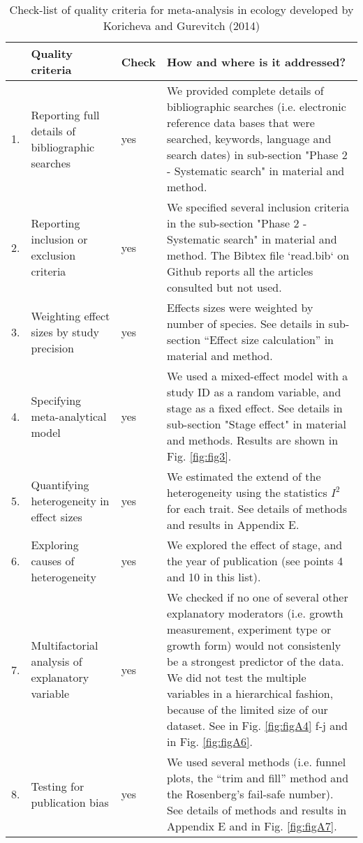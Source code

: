 \documentclass[a4paper,11pt]{article}
\begin{document}
\clearpage
\begin{table}[h!]
\centering
\caption{Check-list of quality criteria for meta-analysis in ecology developed by Koricheva and Gurevitch (2014) }
{\footnotesize
\vspace{0.5cm}
\begin{tabular}{p{0.2cm}p{4cm}p{0.8cm}p{7cm}}
  \hline
  & Quality criteria & Check & How and where is it addressed? \\
  \hline
  1.& Reporting full details of bibliographic searches & yes	& We provided complete details of bibliographic searches (i.e. electronic reference data bases that were searched, keywords, language and search dates) in sub-section "Phase 2 - Systematic search" in material and method.\\
  2.& Reporting inclusion or exclusion criteria & yes & We specified several inclusion criteria in the sub-section "Phase 2 - Systematic search" in material and method. The Bibtex file `read.bib` on Github reports all the articles consulted but not used.\\
  3.& Weighting effect sizes by study precision & yes & Effects sizes were weighted by number of species. See	 details in sub-section ``Effect size calculation'' in material and method.\\
 4.& Specifying meta-analytical model &	yes	& We used a mixed-effect model with a study ID as a random variable, and stage as a fixed effect. See details in sub-section "Stage effect" in material and methods. Results are shown in Fig. \ref{fig:fig3}.\\
 5.& Quantifying heterogeneity in effect sizes &	yes &	We estimated the extend of the heterogeneity using the statistics $I^{2}$ for each trait. See details of methods and results in Appendix E.\\
 6.& Exploring causes of heterogeneity & yes &	We explored the effect of stage, and the year of publication (see points 4 and 10 in this list). \\
 7.& Multifactorial analysis of explanatory variable	& yes & We checked if no one of several other explanatory moderators (i.e. growth measurement, experiment type or growth form) would not consistenly be a strongest predictor of the data. We did not test the multiple variables in a hierarchical fashion, because of the limited size of our dataset. See in Fig. \ref{fig:figA4} f-j and in Fig. \ref{fig:figA6}.\\
  8.& Testing for publication bias &	yes	& We used several methods (i.e. funnel plots, the ``trim and fill'' method and the Rosenberg’s fail-safe number). See details of methods and results in Appendix E and in Fig. \ref{fig:figA7}.\\

\end{tabular}}
\end{table}
\end{document}
